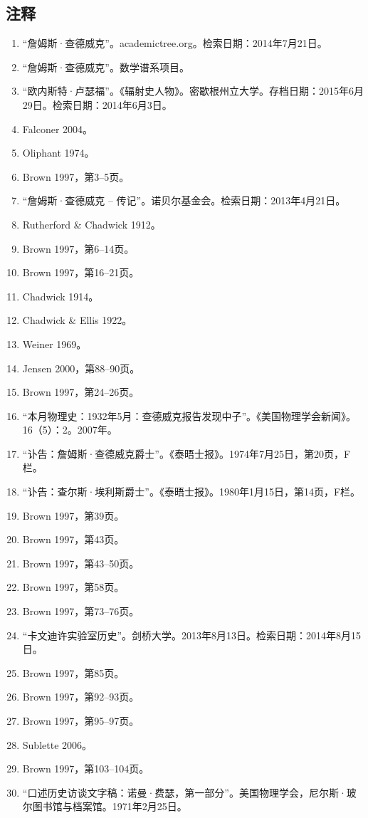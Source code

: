\subsection{注释}
\begin{enumerate}
\item “詹姆斯·查德威克”。academictree.org。检索日期：2014年7月21日。
\item “詹姆斯·查德威克”。数学谱系项目。
\item “欧内斯特·卢瑟福”。《辐射史人物》。密歇根州立大学。存档日期：2015年6月29日。检索日期：2014年6月3日。
\item Falconer 2004。
\item Oliphant 1974。
\item Brown 1997，第3–5页。
\item “詹姆斯·查德威克 – 传记”。诺贝尔基金会。检索日期：2013年4月21日。
\item Rutherford & Chadwick 1912。
\item Brown 1997，第6–14页。
\item Brown 1997，第16–21页。
\item Chadwick 1914。
\item Chadwick & Ellis 1922。
\item Weiner 1969。
\item Jensen 2000，第88–90页。
\item Brown 1997，第24–26页。
\item “本月物理史：1932年5月：查德威克报告发现中子”。《美国物理学会新闻》。16（5）：2。2007年。
\item “讣告：詹姆斯·查德威克爵士”。《泰晤士报》。1974年7月25日，第20页，F栏。
\item “讣告：查尔斯·埃利斯爵士”。《泰晤士报》。1980年1月15日，第14页，F栏。
\item Brown 1997，第39页。
\item Brown 1997，第43页。
\item Brown 1997，第43–50页。
\item Brown 1997，第58页。
\item Brown 1997，第73–76页。
\item “卡文迪许实验室历史”。剑桥大学。2013年8月13日。检索日期：2014年8月15日。
\item Brown 1997，第85页。
\item Brown 1997，第92–93页。
\item Brown 1997，第95–97页。
\item Sublette 2006。
\item Brown 1997，第103–104页。
\item “口述历史访谈文字稿：诺曼·费瑟，第一部分”。美国物理学会，尼尔斯·玻尔图书馆与档案馆。1971年2月25日。


\end{enumerate}

